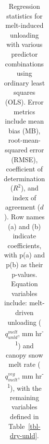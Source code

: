 \documentclass[
]{agujournal2019}
\begin{document}
\begin{landscape}

\begin{longtable}[]{@{}
  >{\raggedright\arraybackslash}p{}
  >{\raggedright\arraybackslash}p{}
  >{\raggedright\arraybackslash}p{}
  >{\raggedright\arraybackslash}p{}
  >{\raggedright\arraybackslash}p{}
  >{\raggedright\arraybackslash}p{}@{}}

\caption{\label{tbl-melt-unld}Regression statistics for melt-induced
unloading with various predictor combinations using ordinary least
squares (OLS). Error metrics include mean bias (MB), root-mean-squared
error (RMSE), coefficient of determination (\(R^2\)), and index of
agreement (\(d\)). Row names (a) and (b) indicate coefficients, with
p(a) and p(b) as their p-values. Equation variables include: melt-driven
unloading (\(q_{unld}^{melt}\), mm hr\textsuperscript{-1}) and canopy
snow melt rate (\(q_{melt}^{veg}\), mm hr\textsuperscript{-1}), with the
remaining variables defined in Table~\ref{tbl-dry-unld}.}

\tabularnewline


\end{longtable}
\end{landscape}
\end{document}
